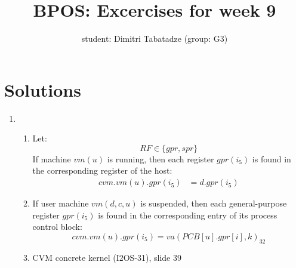 \documentclass{article}
\title{BPOS: Excercises for week 9}
\author{student: Dimitri Tabatadze (group: G3)}
\begin{document}
    \maketitle

    \section*{Solutions}

    \begin{enumerate}
        \item {
			\begin{enumerate}
				\item {
                    Let:
                    \begin{displaymath}
                        RF \in \{gpr, spr\}
                    \end{displaymath}
                    If machine $vm(u)$ is running, then each register $gpr(i_5)$ is found in the corresponding register of the host:
                    \begin{displaymath}
                        \begin{aligned}
                            cvm.vm(u).gpr(i_5) &= d.gpr(i_5)
                        \end{aligned}
                    \end{displaymath}
                }
                \item {
                    If user machine $vm(d, c, u)$ is suspended, then each general-purpose register $gpr(i_5)$ is found in the corresponding entry of its process control block:
                    \begin{displaymath}
                        cvm.vm(u).gpr(i_5) = va(PCB[u].gpr[i], k)_{32}
                    \end{displaymath}
                }
                \item {
                    CVM concrete kernel (I2OS-31), slide 39

}
\end{enumerate}}
\end{enumerate}
\end{document}
